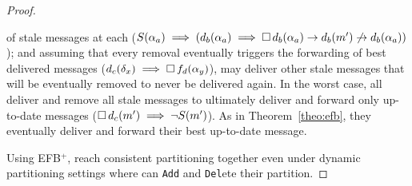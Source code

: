 \begin{proof}
\begin{asparadesc}
    of stale messages at each \process ($S(\alpha_a) \implies
    (d_b(\alpha_a) \implies \square\, d_b(\alpha_a) \rightarrow
    d_b(m') \not\rightarrow d_b(\alpha_a))$); and assuming that every
    removal eventually triggers the forwarding of best delivered
    messages ($d_c(\delta_x) \implies \square\, f_d(\alpha_y)$),
    \processes may deliver other stale messages that will be 
    eventually removed to never be delivered again. In the worst case,
    all \processes deliver and remove all stale messages to ultimately
    deliver and forward only up-to-date messages ($\square\, d_c(m')
    \implies \neg S(m')$). As in Theorem~\ref{theo:efb}, they
    eventually deliver and forward their best up-to-date message.
    
    







    
  \end{asparadesc}
  Using EFB$^+$, \processes reach consistent partitioning together
  even under dynamic partitioning settings where \nodes can
  \texttt{Add} and \texttt{Del}ete their partition.
\end{proof}


